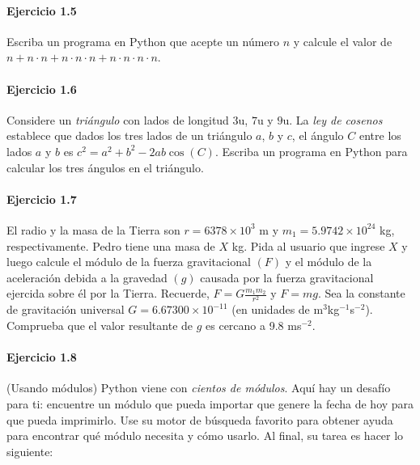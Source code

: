 \paragraph{\color{DarkBlue}Ejercicio 1.5}
Escriba un programa en Python que acepte un número $n$ y
calcule el valor de
\begin{math}
	n +
	n\cdot n +
	n\cdot n\cdot n +
	n\cdot n\cdot n\cdot n
\end{math}.

\paragraph{\color{DarkBlue}Ejercicio 1.6}
Considere un \emph{triángulo} con lados de longitud $3$u, $7$u y
$9$u.
La \emph{ley de cosenos} establece que dados los tres lados de un
triángulo $a$, $b$ y $c$, el ángulo $C$ entre los lados $a$ y $b$ es
\begin{math}
	c^{2}=
	a^{2}+
	b^{2}-
	2ab\cos\left(C\right)
\end{math}.
Escriba un programa en Python para calcular los tres ángulos en el
triángulo.

\paragraph{\color{DarkBlue}Ejercicio 1.7}
El radio y la masa de la Tierra son
\begin{math}
	r =
	6378\times10^{3}
\end{math}
m y
\begin{math}
	m_{1}=
	5.9742\times10^{24}
\end{math}
kg, respectivamente.
Pedro tiene una masa de $X$ kg.
Pida al usuario que ingrese $X$ y luego calcule el módulo de la
fuerza gravitacional $\left(F\right)$ y el módulo de la aceleración
debida a la gravedad $\left(g\right)$ causada por la fuerza
gravitacional ejercida sobre él por la Tierra.
Recuerde, $F=G\frac{m_{1}m_{2}}{r^{2}}$ y $F=mg$.
Sea la constante de gravitación universal $G=6.67300\times 10^{-11}$
(en unidades de m$^{3}$kg$^{-1}$s$^{-2}$).
Comprueba que el valor resultante de $g$ es cercano a 9.8 ms$^{-2}$.

\paragraph{\color{DarkBlue}Ejercicio 1.8}
(Usando módulos) Python viene con \emph{cientos de módulos}.
Aquí hay un desafío para ti: encuentre un módulo que pueda importar
que genere la fecha de hoy para que pueda imprimirlo.
Use su motor de búsqueda favorito para obtener ayuda para encontrar
qué módulo necesita y cómo usarlo.
Al final, su tarea es hacer lo siguiente:
\begin{listing}[ht!]
	\inputminted{python}{1.8.py}
\end{listing}

